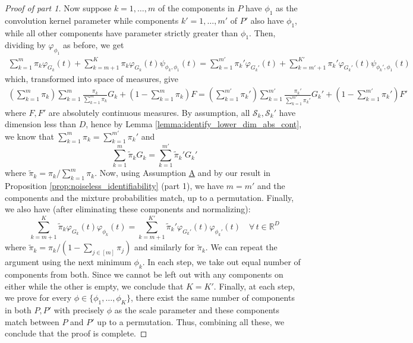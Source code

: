 \documentclass[bj,authoryear]{imsart}
\theoremstyle{plain}
\theoremstyle{remark}
\def\bbR{\mathbb{R}}
\def\cS{\mathcal{S}}
\begin{document}
\begin{appendix}
\begin{proof}[Proof of part 1]
     Now suppose $k=1,\dots,m$ of the components in $P$ have $\phi_1$ as the convolution kernel parameter while components $k'=1,\dots,m'$ of $P'$ also have $\phi_1$, while all other components have parameter strictly greater than $\phi_1$. Then, dividing by $\varphi_{\phi_1}$ as before, we get
     \begin{align}\label{eq:identifiability_cf}
         \sum_{k=1}^m \pi_k\varphi_{G_k}(t) + \sum_{k=m+1}^K \pi_k \varphi_{G_k}(t)\psi_{\phi_k,\phi_1}(t) = \sum_{k=1}^{m'} \pi_k'\varphi_{G_k'}(t) + \sum_{k=m'+1}^{K'} \pi_k' \varphi_{G_k'}(t)\psi_{\phi_k', \phi_1}(t)
     \end{align}
     which, transformed into space of measures, give
     \begin{align}\label{eq:identifiability_cf2}
         \left(\sum_{k=1}^m \pi_k\right)\sum_{k=1}^m \frac{\pi_k}{\sum_{k=1}^m \pi_k} G_k + \left(1-\sum_{k=1}^m \pi_k\right)F = \left(\sum_{k=1}^{m'} \pi_k'\right)\sum_{k=1}^{m'} \frac{\pi_k'}{\sum_{k=1}^{m'} \pi_k'}  G_k' + \left(1-\sum_{k=1}^{m'} \pi_k'\right)F'
     \end{align}
     where $F, F'$ are absolutely continuous measures. By assumption, all $\cS_k, \cS_k'$ have dimension less than $D$, hence by Lemma \ref{lemma:identify_lower_dim_abs_cont}, we know that $\sum_{k=1}^m \pi_k = \sum_{k=1}^{m'}\pi_k'$ and 
     $$\sum_{k=1}^m \tilde{\pi}_k G_k = \sum_{k=1}^{m'} \tilde{\pi}_k' G_k'$$
     where $\tilde{\pi}_k = \pi_k / \sum_{k=1}^m \pi_k$. Now, using Assumption \hyperref[assume:A]{A} and by our result in Proposition \ref{prop:noiseless_identifiability} (part 1), we have $m=m'$ and the components and the mixture probabilities match, up to a permutation. Finally, we also have (after eliminating these components and normalizing):
     $$\sum_{k=m+1}^K \tilde{\pi}_k \varphi_{G_k}(t)\varphi_{\phi_k}(t) = \sum_{k=m+1}^{K'} \tilde{\pi}_k' \varphi_{G_k'}(t)\varphi_{\phi_k'}(t)\quad \forall\, t\in\bbR^D$$
     where $\tilde{\pi}_k = \pi_k/(1 - \sum_{j\in[m]}\pi_j)$ and similarly for $\tilde{\pi}_k$. We can repeat the argument using the next minimum $\phi_k$. In each step, we take out equal number of components from both. Since we cannot be left out with any components on either while the other is empty, we conclude that $K=K'$. Finally, at each step, we prove for every $\phi\in \{\phi_1,\dots,\phi_K\}$, there exist the same number of components in both $P,P'$ with precisely $\phi$ as the scale parameter and these components match between $P$ and $P'$ up to a permutation. Thus, combining all these, we conclude that the proof is complete.
\end{proof}


\end{appendix}
\end{document}
